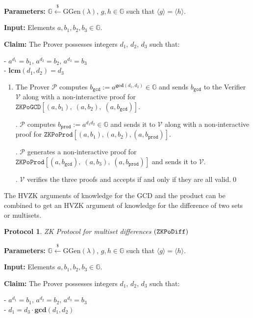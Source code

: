 \documentclass[11pt, lettersize, notitlepage, leqno, footskip=0.6cm]{article}
\newcommand{\ttt}{\texttt}
\newcommand{\bG}{\mathbb{G}}
\newcommand{\la}{\langle}
\newcommand{\ra}{\rangle}
\newcommand{\mc}{\mathcal}
\newcommand{\mb}{\mathbb}
\newcommand{\mbf}{\mathbf}
\newcommand{\mr}{\mathrm}
\newcommand{\lamb}{\lambda}
\newcommand{\mP}{\mc{P}}
\newcommand{\V}{\mc{V}}
\newcommand{\vs}{\vspace{-0.15cm}}
\newcommand{\noin}{\noindent}
\newcommand{\LCM}{\mbf{lcm}}
\newcommand{\GCD}{\mbf{gcd}}
\newtheorem{Prot}[Thm]{Protocol}
\numberwithin{equation}{section}
\begin{document}
\noin \textbf{Parameters:} $\mb{G}\xleftarrow{\$} \mr{GGen}(\lamb)$,  $g,h\in \mb{G}$ such that $\la g \ra = \la h \ra$.

\noin \textbf{Input:} Elements $a, b_1, b_2, b_3 \in \mb{G}$.

\noin \textbf{Claim:} The Prover possesses integers $d_1$, $d_2$, $d_3$ such that:

\noin - $a^{d_1} = b_1$, $a^{d_2} = b_2$, $a^{d_3} = b_3$\\
\noin - $\LCM(d_1, d_2) = d_3$
 

\begin{enumerate}[wide, labelwidth=!, labelindent=0pt]\vs \item The Prover $\mP$ computes $b_{\ttt{gcd}}:= a^{\GCD(d_1,d_2)}\in \bG$ and sends $b_{\ttt{gcd}}$ to the Verifier $\V$ along with a non-interactive proof for $\ttt{ZKPoGCD}[(a,b_1),\;(a,b_2),\;(a,b_{\ttt{gcd}})]$.

\noin 2. $\mP$ computes $b_{\ttt{prod}}:= a^{d_1d_2}\in \bG$ and sends it to $\V$ along with a non-interactive proof for $\ttt{ZKPoProd}[(a, b_1), (a, b_2), (a,b_{\ttt{prod}})]$.

\noin 3. $\mP$ generates a non-interactive proof for $\ttt{ZKPoProd}[(a, b_{\ttt{gcd}}),\;(a, b_3),\; (a,b_{\ttt{prod}})]$ and sends it to $\V$.

\noin 4. $\V$ verifies the three proofs and accepts if and only if they are all valid.\qed \end{enumerate}




\noin The HVZK arguments of knowledge for the GCD and the product can be combined to get an HVZK argument of knowledge for the difference of two sets or multisets.

\begin{Prot} ZK Protocol for multiset differences $(\tt{ZKPoDiff})$\end{Prot} \vspace{-0.3cm}

\noin \textbf{Parameters:} $\mb{G}\xleftarrow{\$} \mr{GGen}(\lamb)$,  $g,h\in \mb{G}$ such that $\la g \ra = \la h \ra$.

\noin \textbf{Input:} Elements $a, b_1, b_2, b_3 \in \mb{G}$.

\noin \textbf{Claim:} The Prover possesses integers $d_1$, $d_2$, $d_3$ such that:

\noin - $a^{d_1} = b_1$, $a^{d_2} = b_2$, $a^{d_3} = b_3$\\
\noin - $d_1 = d_3\cdot \GCD(d_1,d_2)$
 
\end{document}
